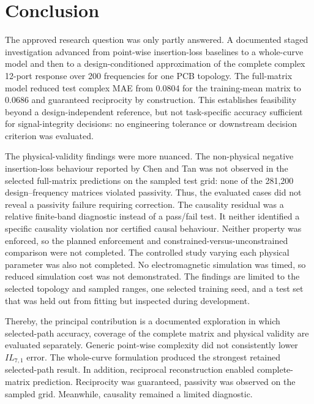 \balance
\section{Conclusion}
\label{sec:conclusion}

The approved research question was only partly answered. A documented staged
investigation advanced from point-wise insertion-loss baselines to a whole-curve model
and then to a design-conditioned approximation of the complete complex 12-port response
over 200 frequencies for one PCB topology. The full-matrix model reduced test complex
MAE from 0.0804 for the training-mean
matrix to 0.0686 and guaranteed reciprocity by construction. This establishes
feasibility beyond a design-independent reference, but not task-specific
accuracy sufficient for signal-integrity decisions: no engineering tolerance
or downstream decision criterion was evaluated.

The physical-validity findings were more nuanced. The non-physical negative
insertion-loss behaviour reported by Chen and Tan \cite{chen2021physics} was not
observed in the selected full-matrix predictions on the sampled test grid: none
of the 281,200 design--frequency matrices violated passivity. Thus, the evaluated
cases did not reveal a passivity failure requiring correction. The
causality residual was a relative finite-band diagnostic instead of a
pass/fail test. It neither identified a specific causality violation nor
certified causal behaviour. Neither property was enforced, so the planned
enforcement and constrained-versus-unconstrained comparison were not completed.
The controlled study varying each physical parameter was also not completed.
No electromagnetic simulation was timed, so reduced simulation cost was not
demonstrated. The findings are limited to the selected topology and sampled
ranges, one selected training seed, and a test set that was held out from
fitting but inspected during development.

Thereby, the principal contribution is a documented exploration in which
selected-path accuracy, coverage of the complete matrix and physical validity
are evaluated separately. Generic point-wise complexity did not consistently lower
$IL_{7,1}$ error. The whole-curve formulation produced the strongest retained
selected-path result. In addition, reciprocal reconstruction enabled complete-matrix
prediction. Reciprocity was guaranteed, passivity was observed on the sampled
grid. Meanwhile, causality remained a limited diagnostic.

